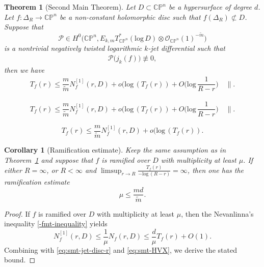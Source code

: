 \documentclass[10pt,a4paper]{amsart}
\newtheorem{thm}{Theorem}
\newtheorem{cor}{Corollary}
\def\log{\mathrm{log}\,}
\begin{document}
\begin{thm}[Second Main Theorem] \label{smt from jet}
	Let $D\subset\mathbb{C}\mathbb{P}^n$ be a hypersurface of degree $d$.
	Let $f\colon\Delta_R\rightarrow \mathbb{C}\mathbb{P}^n$ be a non-constant holomorphic disc such that $f(\Delta_R)\not\subset D$. Suppose that
	\[
	\mathscr{P}
	\in
	H^0
	\big(
	\mathbb{C}\mathbb{P}^n,
	E_{k,m}T_{\mathbb{C}\mathbb{P}^n}^*(\log D)
	\otimes
	\mathcal{O}_{\mathbb{C}\mathbb{P}^n}(1)^{-\widetilde{m}}
	\big)
	\]
	is a nontrivial negatively twisted logarithmic $k$-jet differential such that
	\begin{align}
		\label{eq_canPfjets-section2}
		\mathscr{P}\big(j_k(f)
		\big)
		\not\equiv
		0,
	\end{align}
	then we have
	\begin{align}\label{eq:smt-jet-disc-r}
		T_f(r)\leq\dfrac{m}{\widetilde{m}}N^{[1]}_f(r,D)+o(\log (T_f(r))+O\bigg(\log\dfrac{1}{R-r}\bigg)\quad\parallel.
	\end{align}
\end{thm}

	\begin{align}
		T_f(r)\leq\dfrac{m}{\widetilde{m}}N^{[1]}_f(r,D)+o(\log (T_f(r))+O\bigg(\log\dfrac{1}{R-r}\bigg)\quad\parallel.
	\end{align}

	\begin{equation}\label{eq:smt-HVX}
		T_f(r)\leq\dfrac{m}{\widetilde{m}}N^{[1]}_f(r,D)+o(\log (T_f(r)).
	\end{equation}

\begin{cor}[Ramification estimate]
	\label{ramification}
	Keep the same assumption as in Theorem~\ref{smt from jet} and suppose that $f$ is ramified over $D$ with multiplicity at least $\mu$. If either $R=\infty$, or $R<\infty$ and $\limsup_{r\rightarrow R}\frac{T_f(r)}{-\log (R-r)}=\infty$, then one has the ramification estimate
	\[
	\mu\leq \dfrac{md}{\widetilde{m}}.
	\]
\end{cor}

\begin{proof}
	If $f$ is ramified over $D$ with multiplicity at least $\mu$, then the Nevanlinna's inequality \eqref{-fmt-inequality} yields
	\[N^{[1]}_f(r,D)\leq \frac{1}{\mu} N_f(r,D)\leq \frac{d}{\mu}T_f(r)+O(1).\]
	Combining with \eqref{eq:smt-jet-disc-r} and \eqref{eq:smt-HVX}, we derive the stated bound.
\end{proof}
\end{document}
